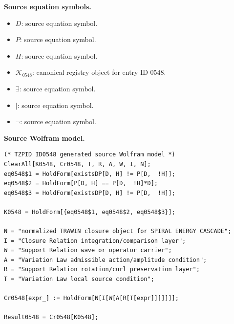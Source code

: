 \begin{minipage}[t]{0.49\linewidth}
\begingroup
\small
\raggedright
\textbf{Source equation symbols.}\par
\begin{itemize}[leftmargin=1.35em,itemsep=1pt,topsep=1pt,parsep=0pt]
    \item $D$: source equation symbol.
    \item $P$: source equation symbol.
    \item $H$: source equation symbol.
    \item $\mathcal{K}_{0548}$: canonical registry object for entry ID 0548.
    \item $\exists$: source equation symbol.
    \item $\mid$: source equation symbol.
    \item $\neg$: source equation symbol.
\end{itemize}
\endgroup
\end{minipage}\hfill
\begin{minipage}[t]{0.47\linewidth}
\begingroup
\scriptsize
\raggedright
\textbf{Source Wolfram model.}\par
\begin{Verbatim}[fontsize=\tiny,breaklines=true,breakanywhere=true]
(* TZPID ID0548 generated source Wolfram model *)
ClearAll[K0548, Cr0548, T, R, A, W, I, N];
eq0548$1 = HoldForm[existsDP[D, H] != P[D,  !H]];
eq0548$2 = HoldForm[P[D, H] == P[D,  !H]*D];
eq0548$3 = HoldForm[existsDP[D, H] != P[D,  !H]];

K0548 = HoldForm[{eq0548$1, eq0548$2, eq0548$3}];

N = "normalized TRAWIN closure object for SPIRAL ENERGY CASCADE";
I = "Closure Relation integration/comparison layer";
W = "Support Relation wave or operator carrier";
A = "Variation Law admissible action/amplitude condition";
R = "Support Relation rotation/curl preservation layer";
T = "Variation Law local source condition";

Cr0548[expr_] := HoldForm[N[I[W[A[R[T[expr]]]]]]];

Result0548 = Cr0548[K0548];
\end{Verbatim}
\endgroup
\end{minipage}

